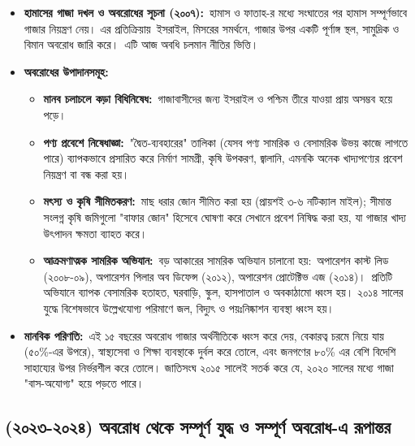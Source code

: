 \begin{itemize}
\item
  \textbf{হামাসের গাজা দখল ও অবরোধের সূচনা (২০০৭):}~হামাস ও ফাতাহ-র মধ্যে
  সংঘাতের পর হামাস সম্পূর্ণভাবে গাজার নিয়ন্ত্রণ নেয়। এর প্রতিক্রিয়ায়~ইসরাইল,
  মিসরের সমর্থনে, গাজার উপর একটি পূর্ণাঙ্গ স্থল, সামুদ্রিক ও বিমান অবরোধ জারি
  করে।~এটি আজ অবধি চলমান নীতির ভিত্তি।
\item
  \textbf{অবরোধের উপাদানসমূহ:}

  \begin{itemize}
  \item
    \textbf{মানব চলাচলে কড়া বিধিনিষেধ:}~গাজাবাসীদের জন্য ইসরাইল ও পশ্চিম
    তীরে যাওয়া প্রায় অসম্ভব হয়ে পড়ে।
  \item
    \textbf{পণ্য প্রবেশে নিষেধাজ্ঞা:}~"দ্বৈত-ব্যবহারের" তালিকা (যেসব পণ্য
    সামরিক ও বেসামরিক উভয় কাজে লাগতে পারে) ব্যাপকভাবে প্রসারিত করে নির্মাণ
    সামগ্রী, কৃষি উপকরণ, জ্বালানি, এমনকি অনেক খাদ্যপণ্যের প্রবেশ নিয়ন্ত্রণ বা
    বন্ধ করা হয়।
  \item
    \textbf{মৎস্য ও কৃষি সীমিতকরণ:}~মাছ ধরার জোন সীমিত করা হয় (প্রায়শই ৩-৬
    নটিক্যাল মাইল); সীমান্ত সংলগ্ন কৃষি জমিগুলো "বাফার জোন" হিসেবে ঘোষণা করে
    সেখানে প্রবেশ নিষিদ্ধ করা হয়, যা গাজার খাদ্য উৎপাদন ক্ষমতা ব্যাহত করে।
  \item
    \textbf{আক্রমণাত্মক সামরিক অভিযান:}~বড় আকারের সামরিক অভিযান চালানো
    হয়:~অপারেশন কাস্ট লিড (২০০৮-০৯), অপারেশন পিলার অব ডিফেন্স (২০১২),
    অপারেশন প্রোটেক্টিভ এজ (২০১৪)।~প্রতিটি অভিযানে ব্যাপক বেসামরিক হতাহত,
    ঘরবাড়ি, স্কুল, হাসপাতাল ও অবকাঠামো ধ্বংস হয়। ২০১৪ সালের যুদ্ধে বিশেষভাবে
    উল্লেখযোগ্য পরিমাণে জল, বিদ্যুৎ ও পয়ঃনিষ্কাশন ব্যবস্থা ধ্বংস হয়।
  \end{itemize}
\item
  \textbf{মানবিক পরিণতি:}~এই ১৫ বছরের অবরোধ গাজার অর্থনীতিকে ধ্বংস করে
  দেয়, বেকারত্ব চরমে নিয়ে যায় (৫০\%-এর উপরে), স্বাস্থ্যসেবা ও শিক্ষা ব্যবস্থাকে
  দুর্বল করে তোলে, এবং জনগণের ৮০\% এর বেশি বিদেশি সাহায্যের উপর নির্ভরশীল
  করে তোলে। জাতিসংঘ ২০১৫ সালেই সতর্ক করে যে, ২০২০ সালের মধ্যে গাজা
  "বাস-অযোগ্য" হয়ে পড়তে পারে।
\end{itemize}
\vspace{0.3em}

\subsection{(২০২৩-২০২৪) অবরোধ থেকে \textquotesingle সম্পূর্ণ
যুদ্ধ\textquotesingle{} ও \textquotesingle সম্পূর্ণ অবরোধ\textquotesingle-এ
রূপান্তর}\label{ux985ux9acux9b0ux9a7-ux9a5ux995-ux9b8ux9aeux9aaux9b0ux9a3-ux9afux9a6ux9a7-ux993-ux9b8ux9aeux9aaux9b0ux9a3-ux985ux9acux9b0ux9a7-ux98f-ux9b0ux9aaux9a8ux9a4ux9b0}

